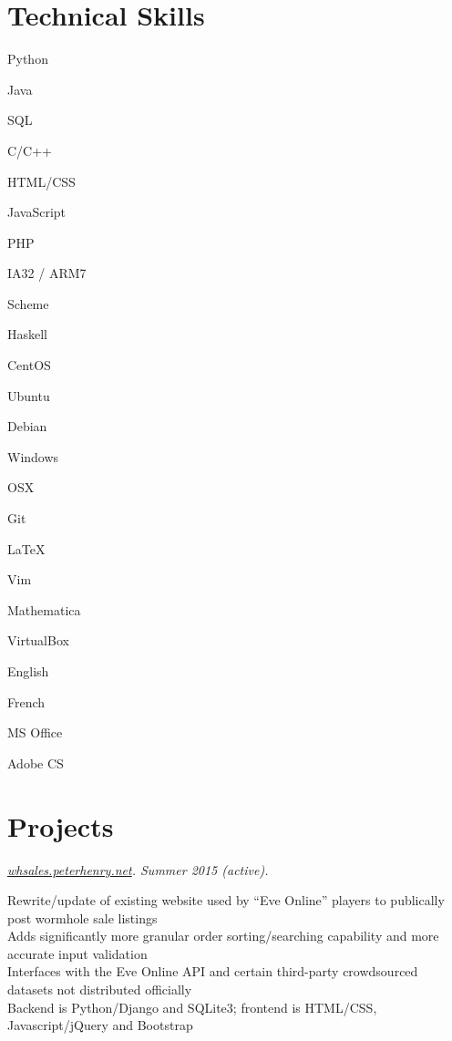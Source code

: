 \documentclass[10pt,letterpaper, full]{article}
\newcommand{\pjtitle}[1]{\renewcommand{\givenpjtitle}{#1}}
\newcommand{\pjtime}[1]{\renewcommand{\givenpjtime}{#1}}
\newcommand{\pjbody}[1]{\renewcommand{\givenpjbody}{#1}}
\newcommand{\givenpjtitle}{REQUIRED!}
\newcommand{\givenpjtime}{REQUIRED!}
\newcommand{\givenpjbody}{REQUIRED!}
\newenvironment{projectenv}
    {
        \begin{adjustwidth}{1em}{0em}
    }
    {
        \textit{\givenpjtitle. \givenpjtime.}

        \begin{minipage}[l]{\textwidth}
            \givenpjbody%
        \end{minipage}\\%


        \end{adjustwidth}
    }
\begin{document}
\section{Technical Skills}
\begin{adjustwidth}{1em}{0em}
    \begin{minipage}[t]{.195\textwidth}
        Python

        Java

        SQL

        C/C++

        HTML/CSS

    \end{minipage}%
    \begin{minipage}[t]{.195\textwidth}
        JavaScript

        PHP

        IA32 / ARM7

        Scheme

        Haskell
    \end{minipage}%
    \begin{minipage}[t]{.195\textwidth}
        CentOS

        Ubuntu

        Debian

        Windows

        OSX
    \end{minipage}%
    \begin{minipage}[t]{.195\textwidth}
        Git

        \LaTeX

        Vim

        Mathematica

        VirtualBox
    \end{minipage}%
    \begin{minipage}[t]{.195\textwidth}
        English

        French

        MS Office

        Adobe CS
    \end{minipage}%
\end{adjustwidth}


\section{Projects}
\begin{projectenv}
    \pjtitle{\href{http://whsales.peterhenry.net}{whsales.peterhenry.net}}
    \pjtime{Summer 2015 (active)}
    \pjbody{
        Rewrite/update of existing website used by “Eve Online” players to
        publically post wormhole sale listings\\
        Adds significantly more granular order sorting/searching capability and
        more accurate input validation\\
        Interfaces with the Eve Online API and certain third-party
        crowdsourced datasets not distributed officially\\
        Backend is Python/Django and SQLite3; frontend is HTML/CSS,
        Javascript/jQuery and Bootstrap\\
    }%
\end{projectenv}%
\end{document}
